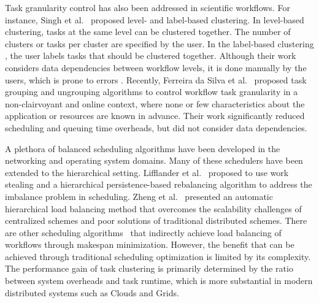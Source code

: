 Task granularity control has also been addressed in scientific workflows. For instance, Singh et al.~\cite{Singh:2008:WTC:1341811.1341822} proposed level- and label-based clustering. In level-based clustering, tasks at the same level can be clustered together. The number of clusters or tasks per cluster are specified by the user. In the label-based clustering , the user labels tasks that should be clustered together. Although their work considers data dependencies between workflow levels, it is done manually by the users, which is prone to errors . Recently, Ferreira da Silva et al.~\cite{Ferreira-granularity-2013,FerreiradaSilva-CCPE-2014} proposed task grouping and ungrouping algorithms to control workflow task granularity in a non-clairvoyant and online context, where none or few characteristics about the application or resources are known in advance. Their work significantly reduced scheduling and queuing time overheads, but did not consider data dependencies.

A plethora of balanced scheduling algorithms have been developed in the networking and operating system domains. Many of these schedulers have been extended to the hierarchical setting. Lifflander et al.~\cite{Lifflander} proposed to use work stealing and a hierarchical persistence-based rebalancing algorithm to address the imbalance problem in scheduling. Zheng et al.~\cite{Zheng} presented an automatic hierarchical load balancing method that overcomes the scalability challenges of centralized schemes and poor solutions of traditional distributed schemes. There are other scheduling algorithms~\cite{rizos2008} that indirectly achieve load balancing of workflows through makespan minimization. However, the benefit that can be achieved through traditional scheduling optimization is limited by its complexity. The performance gain of task clustering is primarily determined by the ratio between system overheads and task runtime, which is more substantial in modern distributed systems such as Clouds and Grids. 

